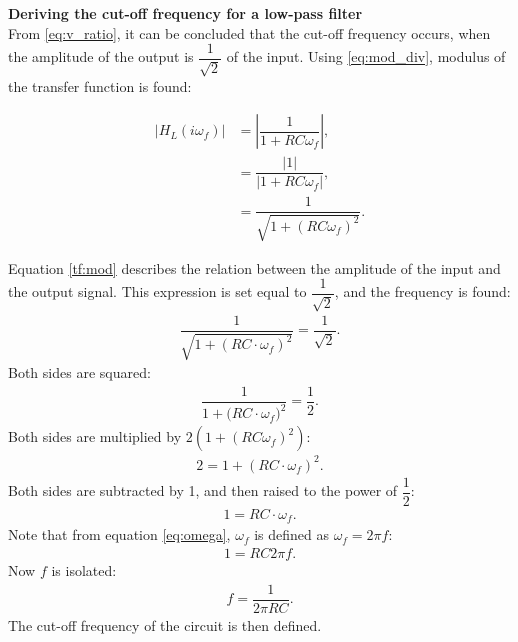 \noindent \textbf{Deriving the cut-off frequency for a low-pass filter}\\

\noindent From \eqref{eq:v_ratio}, it can be concluded that the cut-off frequency occurs, when the amplitude of the output is $\dfrac{1}{\sqrt{2}}$ of the input. Using \eqref{eq:mod_div}, modulus of the transfer function is found:

\begin{align}
\left|H_{L}(i \omega_f) \right| &=  \left|\dfrac{1}{1+RC \omega_f} \right|, \nonumber
\\
&=\dfrac{|1|}{|1+RC\omega_f |}, \nonumber
\\
&=  \dfrac{1}{\sqrt{1+(RC \omega_f)^2}}. \label{tf:mod}
\end{align}

\noindent Equation \eqref{tf:mod} describes the relation between the amplitude of the input and the output signal. This expression is set equal to $\dfrac{1}{\sqrt{2}}$, and the frequency is found:
\\
\begin{align*}
\dfrac{1}{\sqrt{1+ \left(RC \cdot \omega_f \right)^2}} = \dfrac{1}{\sqrt{2}}.
\end{align*}
Both sides are squared:
\begin{align*}
\dfrac{1}{1+ \big(RC \cdot \omega_f \big)^2} = \dfrac{1}{2}.
\end{align*}
	Both sides are multiplied by $2(1+(RC\omega_f)^2)$:
\begin{align*}
2 = 1+ \left(RC \cdot \omega_f \right)^2.
\end{align*}
Both sides are subtracted by 1, and then raised to the power of $\dfrac{1}{2}$:
\begin{align*}
1 = RC \cdot \omega_f .
\end{align*}
Note that from equation \eqref{eq:omega}, $\omega_f$ is defined as $\omega_f=2 \pi f$:
\begin{align*}
1 = RC 2\pi f .
\end{align*}
Now $f$ is isolated:
\begin{align*}
f=\dfrac{1}{2\pi RC}.
\end{align*}
The cut-off frequency of the circuit is then defined.


